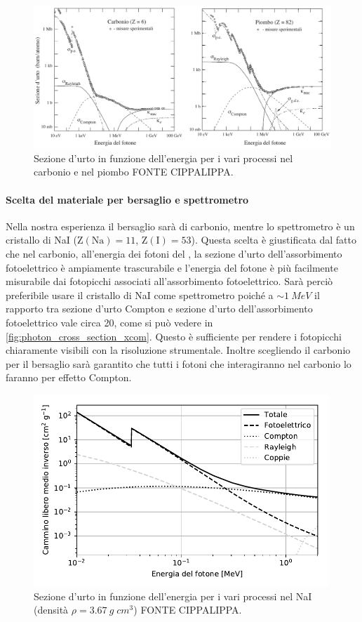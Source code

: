   \begin{figure}[h]
 	\centering
 	\includegraphics[width=\textwidth]{photon-matter-interaction}
 	\caption{\label{fig:photon_cross_section_pdg}Sezione d'urto in funzione dell'energia per i vari processi nel carbonio e nel piombo FONTE CIPPALIPPA.}
 \end{figure}

 \paragraph{Scelta del materiale per bersaglio e spettrometro}
 Nella nostra esperienza il bersaglio sarà di carbonio, mentre lo spettrometro è un cristallo di NaI ($\text{Z}(\text{Na})=11$, $\text{Z}(\text{I})=53$). Questa scelta è giustificata dal fatto che nel carbonio, all'energia dei fotoni del \co{}, la sezione d'urto dell'assorbimento fotoelettrico è ampiamente trascurabile e l'energia del fotone è più facilmente misurabile dai fotopicchi associati all'assorbimento fotoelettrico. Sarà perciò preferibile usare il cristallo di NaI come spettrometro poiché a $\sim\SI{1}{MeV}$ il rapporto tra sezione d'urto Compton e sezione d'urto dell'assorbimento fotoelettrico vale circa 20, come si può vedere in \autoref{fig:photon_cross_section_xcom}. Questo è sufficiente per rendere i fotopicchi chiaramente visibili con la risoluzione strumentale. Inoltre scegliendo il carbonio per il bersaglio  sarà garantito che tutti i fotoni che interagiranno nel carbonio lo faranno per effetto Compton.
  
  \begin{figure}[h]
 	\centering
 	\includegraphics[width=30em]{cross}
 	\caption{\label{fig:photon_cross_section_xcom}Sezione d'urto in funzione dell'energia per i vari processi nel NaI (densità $\rho = \SI{3.67}{g\;cm^3}$) FONTE CIPPALIPPA.}
 \end{figure}
 
